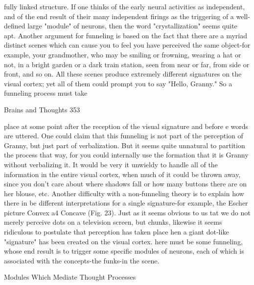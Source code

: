 fully linked structure. If one thinks of the early neural activities as independent, and of
the end result of their many independent firings as the triggering of a well-defined large
"module" of neurons, then the word "crystallization" seems quite apt.
  Another argument for funneling is based on the fact that there are a myriad distinct
scenes which can cause you to feel you have perceived the same object-for example, your
grandmother, who may be smiling or frowning, wearing a hat or not, in a bright garden or
a dark train station, seen from near or far, from side or front, and so on. All these scenes
produce extremely different signatures on the visual cortex; yet all of them could prompt
you to say "Hello, Granny." So a funneling process must take




Brains and Thoughts                                                                       353

place at some point after the reception of the visual signature and before e words are
uttered. One could claim that this funneling is not part of the perception of Granny, but
just part of verbalization. But it seems quite unnatural to partition the process that way,
for you could internally use the formation that it is Granny without verbalizing it. It
would be very it unwieldy to handle all of the information in the entire visual cortex,
when much of it could be thrown away, since you don't care about where shadows fall or
how many buttons there are on her blouse, etc.
  Another difficulty with a non-funneling theory is to explain how there in be different
interpretations for a single signature-for example, the Escher picture Convex a4 Concave
(Fig. 23). Just as it seems obvious to us tat we do not merely perceive dots on a television
screen, but chunks, likewise it seems ridiculous to postulate that perception has taken
place hen a giant dot-like "signature" has been created on the visual cortex. here must be
some funneling, whose end result is to trigger some specific modules of neurons, each of
which is associated with the concepts-the funks-in the scene.

                       Modules Which Mediate Thought Processes

